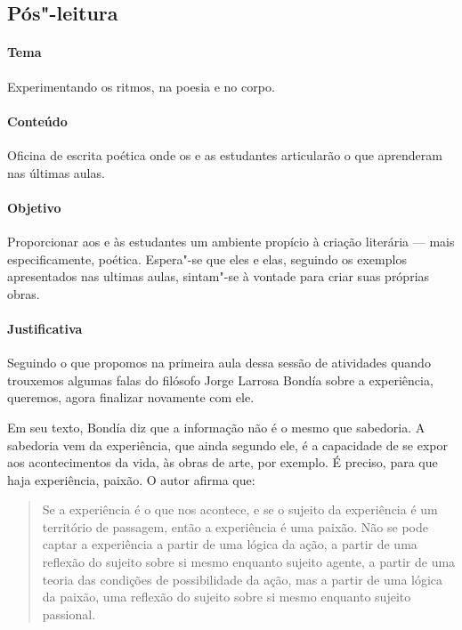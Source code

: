 \documentclass[12pt]{extarticle}
\begin{document}


\subsection{Pós"-leitura}



\paragraph{Tema} Experimentando os ritmos, na poesia e no corpo.

\paragraph{Conteúdo} Oficina de escrita poética onde os e as estudantes 
articularão o que aprenderam nas últimas aulas.

\paragraph{Objetivo} Proporcionar aos e às estudantes um ambiente 
propício à criação literária --- mais especificamente, poética. Espera"-se
que eles e elas, seguindo os exemplos apresentados nas ultimas aulas,
sintam"-se à vontade para criar suas próprias obras.

\paragraph{Justificativa} Seguindo o que propomos na primeira aula dessa
sessão de atividades quando trouxemos algumas falas do filósofo Jorge 
Larrosa Bondía sobre a experiência, queremos, agora finalizar novamente
com ele.

Em seu texto, Bondía diz que a informação não é o mesmo que sabedoria.
A sabedoria vem da experiência, que ainda segundo ele, é a capacidade
de se expor  aos acontecimentos da vida, às obras de arte, por exemplo.
É preciso, para que haja experiência, paixão. O autor afirma que:

\begin{quote}

Se a experiência é 
o que nos acontece, e se o sujeito da experiência é um território de passagem,
então a experiência é uma paixão. Não se pode captar
a experiência a partir de uma lógica da ação, a partir
de uma reflexão do sujeito sobre si mesmo enquanto
sujeito agente, a partir de uma teoria das condições de
possibilidade da ação, mas a partir de uma lógica da
paixão, uma reflexão do sujeito sobre si mesmo enquanto sujeito passional.

\end{quote}
\end{document}
